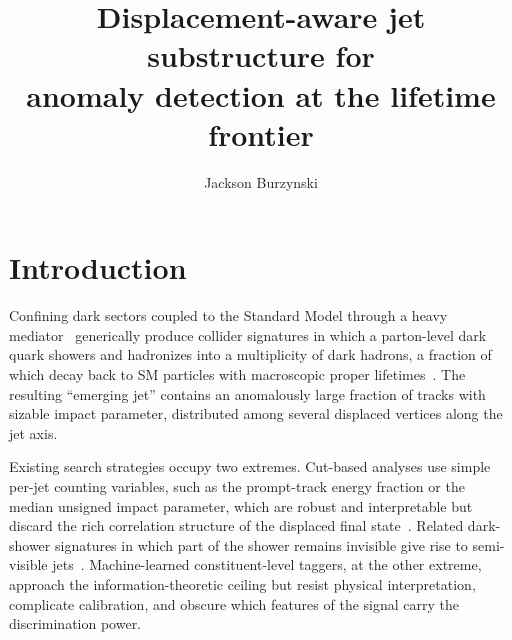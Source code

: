 \documentclass[a4paper,11pt]{article}
\title{Displacement-aware jet substructure for\\
anomaly detection at the lifetime frontier}
\author{Jackson Burzynski}
\begin{document}
\maketitle




\section{Introduction}
\label{sec:intro}

Confining dark sectors coupled to the Standard Model through a heavy
mediator~\cite{Strassler:2006im} generically produce collider signatures in which a parton-level
dark quark showers and hadronizes into a multiplicity of dark hadrons,
a fraction of which decay back to SM particles with macroscopic proper
lifetimes~\cite{Schwaller:2015gea,Albouy:2022cin}. The resulting
``emerging jet'' contains an anomalously large fraction of tracks with
sizable impact parameter, distributed among several displaced vertices
along the jet axis.

Existing search strategies occupy two extremes. Cut-based analyses use
simple per-jet counting variables, such as the prompt-track energy
fraction or the median unsigned impact parameter, which are robust
and interpretable but discard the rich correlation structure of the
displaced final state~\cite{Schwaller:2015gea,ATLAS:EJ,ATLAS:EJRun2,CMS:EJ}.
Related dark-shower signatures in which part of the shower remains
invisible give rise to semi-visible jets~\cite{Cohen:2015toa}.
Machine-learned constituent-level taggers, at the other extreme,
approach the information-theoretic ceiling but resist physical
interpretation, complicate calibration, and obscure which features of
the signal carry the discrimination power.
\end{document}
